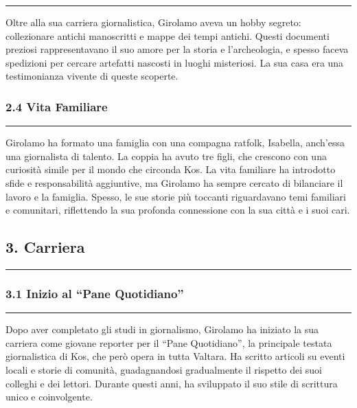 \begin{center}\rule{0.5\linewidth}{0.5pt}\end{center}

Oltre alla sua carriera giornalistica, Girolamo aveva un hobby segreto:
collezionare antichi manoscritti e mappe dei tempi antichi. Questi
documenti preziosi rappresentavano il suo amore per la storia e
l'archeologia, e spesso faceva spedizioni per cercare artefatti nascosti
in luoghi misteriosi. La sua casa era una testimonianza vivente di
queste scoperte.

\subsubsection{2.4 Vita Familiare}\label{vita-familiare}

\begin{center}\rule{0.5\linewidth}{0.5pt}\end{center}

Girolamo ha formato una famiglia con una compagna ratfolk, Isabella,
anch'essa una giornalista di talento. La coppia ha avuto tre figli, che
crescono con una curiosità simile per il mondo che circonda Kos. La vita
familiare ha introdotto sfide e responsabilità aggiuntive, ma Girolamo
ha sempre cercato di bilanciare il lavoro e la famiglia. Spesso, le sue
storie più toccanti riguardavano temi familiari e comunitari,
riflettendo la sua profonda connessione con la sua città e i suoi cari.

\subsection{3. Carriera}\label{carriera}

\begin{center}\rule{0.5\linewidth}{0.5pt}\end{center}

\subsubsection{3.1 Inizio al ``Pane
Quotidiano''}\label{inizio-al-pane-quotidiano}

\begin{center}\rule{0.5\linewidth}{0.5pt}\end{center}

Dopo aver completato gli studi in giornalismo, Girolamo ha iniziato la
sua carriera come giovane reporter per il ``Pane Quotidiano'', la
principale testata giornalistica di Kos, che però opera in tutta
Valtara. Ha scritto articoli su eventi locali e storie di comunità,
guadagnandosi gradualmente il rispetto dei suoi colleghi e dei lettori.
Durante questi anni, ha sviluppato il suo stile di scrittura unico e
coinvolgente.

